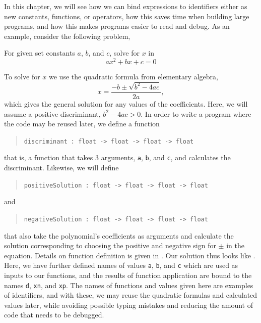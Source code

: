 \documentclass[fsharpNotes.tex]{subfiles}
\begin{document}
In this chapter, we will see how we can bind expressions to identifiers either as new constants, functions, or operators, how this saves time when building large programs, and how this makes programs easier to read and debug. As an example, consider the following problem,
\begin{task}
  For given set constants $a$, $b$, and $c$, solve for $x$ in
  \begin{equation}
  a x^2+bx+c = 0
\end{equation}
\end{task}
To solve for $x$ we use the quadratic formula from elementary algebra,
\begin{equation}
  x = \frac{-b\pm\sqrt{b^2-4ac}}{2a},
\end{equation}
which gives the general solution for any values of the coefficients. Here, we will assume a positive discriminant, $b^2-4ac>0$. In order to write a program where the code may be reused later, we define a function
\begin{quote}
  \lstinline!discriminant : float -> float -> float -> float!
\end{quote}
that is, a function that takes 3 arguments, \lstinline!a!, \lstinline!b!, and \lstinline!c!, and calculates the discriminant. Likewise, we will define
\begin{quote}
  \lstinline!positiveSolution : float -> float -> float -> float!
\end{quote}
and
\begin{quote}
  \lstinline!negativeSolution : float -> float -> float -> float!
\end{quote}
that also take the polynomial's coefficients as arguments and calculate the solution corresponding to choosing the positive and negative sign for $\pm$ in the equation. Details on function definition is given in . Our solution thus looks like .
%
%
Here, we have further defined names of values \lstinline!a!, \lstinline!b!, and \lstinline!c! which are used as inputs to our functions, and the results of function application are bound to the names \lstinline!d!, \lstinline!xn!, and \lstinline!xp!. The names of functions and values given here are examples of identifiers, and with these, we may reuse the quadratic formulas and calculated values later, while avoiding possible typing mistakes and reducing the amount of code that needs to be debugged.
\end{document}
